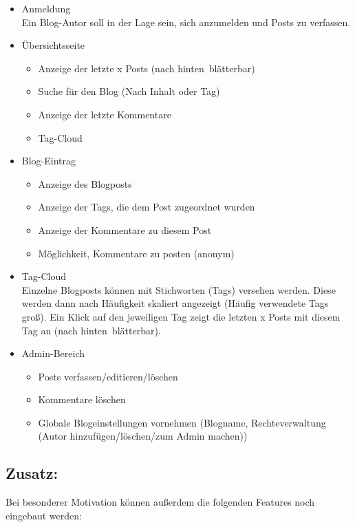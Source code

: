 \documentclass[10pt,a4paper]{article}
\begin{document}
\begin{itemize}
 \item Anmeldung \\
       Ein Blog-Autor soll in der Lage sein, sich anzumelden und Posts zu verfassen.
 \item Übersichtsseite
       \begin{itemize}
        \item Anzeige der letzte x Posts (nach \glqq hinten\grqq \ blätterbar)
        \item Suche für den Blog (Nach Inhalt oder Tag)
        \item Anzeige der letzte Kommentare
        \item Tag-Cloud
       \end{itemize}
 \item Blog-Eintrag
       \begin{itemize}
        \item Anzeige des Blogposts
        \item Anzeige der Tags, die dem Post zugeordnet wurden
        \item Anzeige der Kommentare zu diesem Post
        \item Möglichkeit, Kommentare zu posten (anonym)
       \end{itemize}
 \item Tag-Cloud\\
       Einzelne Blogposts können mit Stichworten (Tags) versehen werden. Diese werden dann nach Häufigkeit skaliert angezeigt (Häufig verwendete Tags groß). Ein Klick auf den jeweiligen Tag zeigt die letzten x Posts mit diesem Tag an (nach \glqq hinten\grqq \ blätterbar).
 \item Admin-Bereich
       \begin{itemize}
        \item Posts verfassen/editieren/löschen
        \item Kommentare löschen
        \item Globale Blogeinstellungen vornehmen (Blogname, Rechteverwaltung (Autor hinzufügen/löschen/zum Admin machen))
       \end{itemize}
\end{itemize}


\subsection*{Zusatz:}

Bei besonderer Motivation können außerdem die folgenden Features noch eingebaut werden:\bigskip
 
\end{document}
